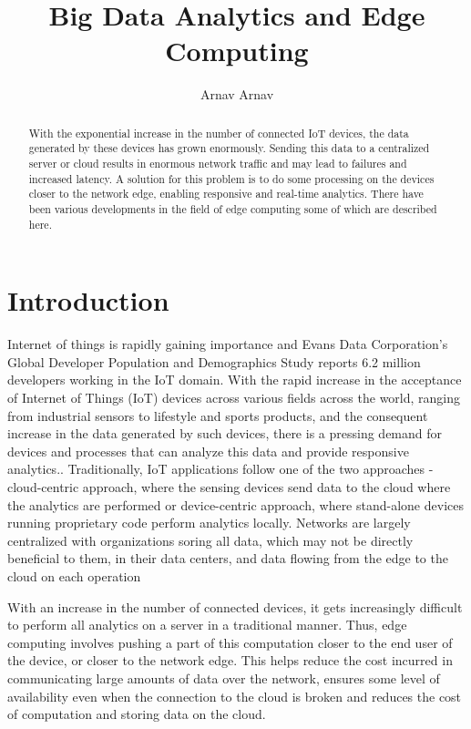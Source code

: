\documentclass[sigconf]{acmart}
\begin{document}
\title{Big Data Analytics and Edge Computing}


\author{Arnav Arnav}

\begin{abstract}
With the exponential increase in the number of connected IoT devices, the data generated by these devices has grown enormously. Sending this data to a centralized server or cloud results in enormous network traffic and may lead to failures and increased latency. A solution for this problem is to do some processing on the devices closer to the network edge, enabling responsive and real-time analytics. There have been various developments in the field of edge computing some of which are described here.
\end{abstract}

\maketitle
\section{Introduction}
Internet of things is rapidly gaining importance and Evans Data Corporation’s Global Developer Population and Demographics Study reports 6.2 million developers working in the IoT domain.\cite{ibm_data_streaming_analytics} With the rapid increase in the acceptance of Internet of Things (IoT) devices across various fields across the world, ranging from industrial sensors to lifestyle and sports products, and the consequent increase in the data generated by such devices, there is a pressing demand for devices and processes that can analyze this data and provide responsive analytics.\cite{ieee_iot_cloud_analytics_newsletter}. Traditionally, IoT applications follow one of the two approaches - cloud-centric approach, where the sensing devices send data to the cloud where the analytics are performed or device-centric approach, where stand-alone devices running proprietary code perform analytics locally\cite{ieee_iot_cloud_analytics_newsletter}. Networks are largely centralized with  organizations soring all data, which may not be directly beneficial to them, in their data centers, and data flowing from the edge to the cloud on each operation\cite{ibm_iot_edge}

With an increase in the number of connected devices, it gets increasingly difficult to perform all analytics on a server in a traditional manner. Thus, edge computing involves pushing a part of this computation closer to the end user of the device, or closer to the network edge\cite{wiki-edge-computing}\cite{ibm_iot_edge}. This helps reduce the cost incurred in communicating large amounts of data over the network, ensures some level of availability even when the connection to the cloud is broken and reduces the cost of computation and storing data on the cloud\cite{ieee_iot_cloud_analytics_newsletter}\cite{ibm_iot_edge}.
\end{document}
